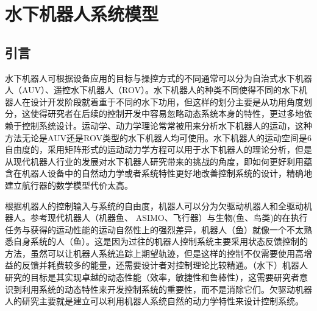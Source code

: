 \newcommand\bu{\bm{u}}
\newcommand\bx{\bm{x}}




\chapter{水下机器人系统模型 }


\label{chap:Theory}
\section{引言}
水下机器人可根据设备应用的目标与操控方式的不同通常可以分为自治式水下机器人（AUV）、遥控水下机器人（ROV）。水下机器人的种类不同使得不同的水下机器人在设计开发阶段就着重于不同的水下功用，但这样的划分主要是从功用角度划分，这使得研究者在后续的控制开发中容易忽略动态系统本身的特性，更过多地依赖于控制系统设计。运动学、动力学理论常常被用来分析水下机器人的运动，这种方法无论是AUV还是ROV类型的水下机器人均可使用。水下机器人的运动空间是6自由度的，采用矩阵形式的运动动力学方程可以用于水下机器人的理论分析，但是从现代机器人行业的发展对水下机器人研究带来的挑战的角度，即如何更好利用蕴含在机器人设备中的自然动力学或者系统特性更好地改善控制系统的设计，精确地建立航行器的数学模型代价太高。

根据机器人的控制输入与系统的自由度，机器人可以分为欠驱动机器人和全驱动机器人。参考现代机器人（机器鱼、 ASIMO、飞行器）与生物(鱼、鸟类)的在执行任务与获得的运动性能的运动自然性上的强烈差异，机器人（鱼）就像一个不太熟悉自身系统的人（鱼）\cite{russdrakebook}。这是因为过往的机器人控制系统主要采用状态反馈控制的方法，虽然可以让机器人系统追踪上期望轨迹，但是这样的控制不仅需要使用高增益的反馈并耗费较多的能量，还需要设计者对控制理论比较精通。（水下）机器人研究的目标是其实现卓越的动态性能（效率，敏捷性和鲁棒性），这需要研究者意识到利用系统的动态特性来开发控制系统的重要性，而不是消除它们。欠驱动机器人的研究主要就是建立可以利用机器人系统自然的动力学特性来设计控制系统。

